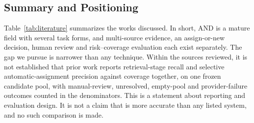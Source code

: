 \subsection{Summary and Positioning}
Table~\ref{tab:literature} summarizes the works discussed. In short, AND is a mature field with several task forms, and multi-source evidence, an assign-or-new decision, human review and risk--coverage evaluation each exist separately. The gap we pursue is narrower than any technique. Within the sources reviewed, it is not established that prior work reports retrieval-stage recall and selective automatic-assignment precision against coverage together, on one frozen candidate pool, with manual-review, unresolved, empty-pool and provider-failure outcomes counted in the denominators. This is a statement about reporting and evaluation design. It is not a claim that \hammer{} is more accurate than any listed system, and no such comparison is made.


